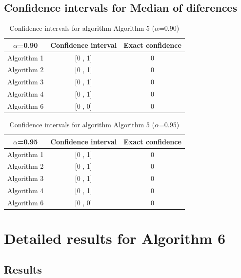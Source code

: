 \documentclass[a4paper,10pt]{article}
\begin{document}
\subsection{Confidence intervals for Median of diferences}

\begin{table}[!htp]
\centering\small
\begin{tabular}{
|c|c|c|}
\hline
 $\alpha$=0.90 & Confidence interval & Exact confidence \\ \hline 
Algorithm 1 & [0 , 1] & 0\\ \hline 
Algorithm 2 & [0 , 1] & 0\\ \hline 
Algorithm 3 & [0 , 1] & 0\\ \hline 
Algorithm 4 & [0 , 1] & 0\\ \hline 
Algorithm 6 & [0 , 0] & 0\\ \hline 

\end{tabular}
\caption{Confidence intervals for algorithm Algorithm 5 ($\alpha$=0.90)}
\end{table}
\begin{table}[!htp]
\centering\small
\begin{tabular}{
|c|c|c|}
\hline
 $\alpha$=0.95 & Confidence interval & Exact confidence \\ \hline 
Algorithm 1 & [0 , 1] & 0\\ \hline 
Algorithm 2 & [0 , 1] & 0\\ \hline 
Algorithm 3 & [0 , 1] & 0\\ \hline 
Algorithm 4 & [0 , 1] & 0\\ \hline 
Algorithm 6 & [0 , 0] & 0\\ \hline 

\end{tabular}
\caption{Confidence intervals for algorithm Algorithm 5 ($\alpha$=0.95)}
\end{table}

 \clearpage 


\section{Detailed results for Algorithm 6}


\subsection{Results}
\end{document}
